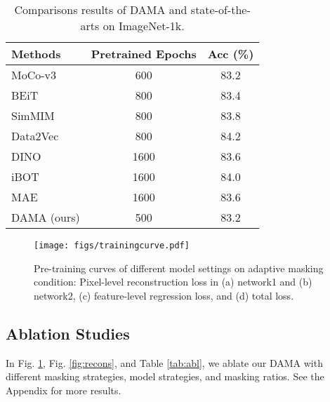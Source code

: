 \documentclass[10pt,twocolumn,letterpaper]{article}
\begin{document}
\begin{table}[t]
\centering
\footnotesize
\begin{tabular}{lcc}
\hline
Methods     & Pretrained Epochs & Acc (\%) \\
\hline
MoCo-v3 \cite{mocov3}    & 600               & 83.2     \\
BEiT \cite{beit}       & 800               & 83.4     \\
SimMIM \cite{simmim}     & 800               & 83.8     \\
Data2Vec \cite{data2vec}   & 800               & 84.2     \\
DINO \cite{dino}       & 1600              & 83.6     \\
iBOT \cite{zhou2021ibot}       & 1600              & 84.0     \\
MAE \cite{mae}       & 1600              & 83.6     \\
DAMA (ours) & 500               & 83.2    \\
\hline
\end{tabular}
\caption{Comparisons results of DAMA and state-of-the-arts on ImageNet-1k.\label{tab:resultimagenet}}
\end{table}
\begin{figure}[t]
\centering
\texttt{[image: figs/trainingcurve.pdf]}
\caption{Pre-training curves of different model settings on adaptive masking condition: Pixel-level reconstruction loss in (a) network1 and (b) network2, (c) feature-level regression loss, and (d) total loss.}
\label{fig:traincurve}
\vspace{-5pt}
\end{figure}


\subsection{Ablation Studies}\label{sec:ablation}
In Fig. \ref{fig:traincurve}, Fig. \ref{fig:recons}, and Table \ref{tab:abl}, we ablate our DAMA with different masking strategies, model strategies, and masking ratios. See the Appendix for more results.
\end{document}
